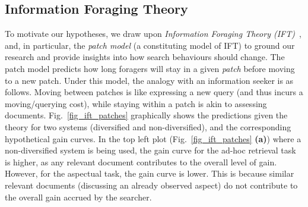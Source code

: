 \subsection{Information Foraging Theory} \label{sec:ift}


To motivate our hypotheses, we draw upon \emph{Information Foraging Theory (IFT)}~\cite{pirolli1999ift}, and, in particular, the \textit{patch model} (a constituting model of IFT) to ground our research and provide insights into how search behaviours should change. %
The patch model predicts how long foragers will stay in a given \emph{patch} before moving to a new patch. Under this model, the analogy with an information seeker is as follows. Moving between patches is like expressing a new query (and thus incurs a moving/querying cost), while staying within a patch is akin to assessing documents. 
Fig.~\ref{fig_ift_patches} graphically shows the predictions given the theory for two systems (diversified and non-diversified), and the corresponding hypothetical gain curves. In the top left plot (Fig.~\ref{fig_ift_patches} \textbf{(a)}) where a non-diversified system is being used, the gain curve for the ad-hoc retrieval task is higher, as any relevant document contributes to the overall level of gain. However, for the aspectual task, the gain curve is lower. This is because similar relevant documents (discussing an already observed aspect) do not contribute to the overall gain accrued by the searcher.

